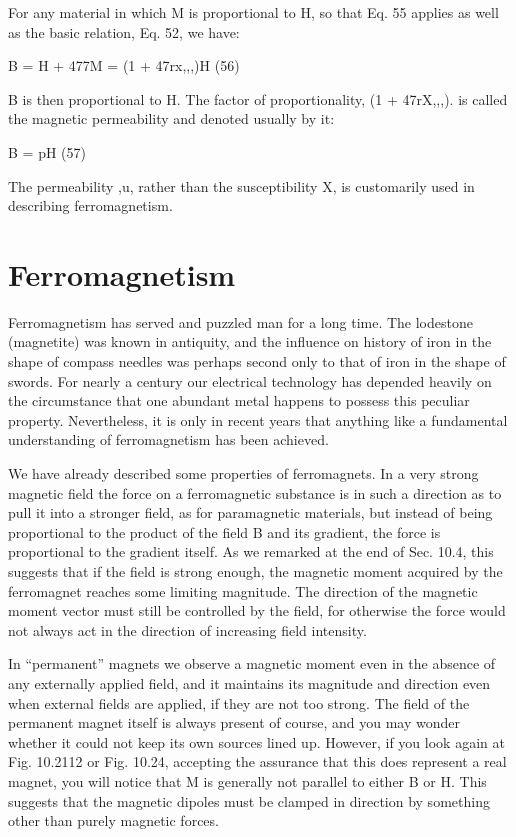 {For any material in which M is proportional to H, so that Eq. 55
applies as well as the basic relation, Eq. 52, we have:
\begin{equation}
\end{equation}

B = H + 477M = (1 + 47rx,,,)H (56)

B is then proportional to H. The factor of proportionality,
(1 + 47rX,,,). is called the magnetic permeability and denoted usually
by it:
\begin{equation}
\end{equation}

B = pH (57)

The permeability ,u, rather than the susceptibility X, is customarily
used in describing ferromagnetism.

\section{Ferromagnetism}

Ferromagnetism has served and puzzled man for a long time.
The lodestone (magnetite) was known in antiquity, and the influence
on history of iron in the shape of compass needles was perhaps second
only to that of iron in the shape of swords. For nearly a century
our electrical technology has depended heavily on the circumstance
that one abundant metal happens to possess this peculiar property.
Nevertheless, it is only in recent years that anything like a fundamental
understanding of ferromagnetism has been achieved.

We have already described some properties of ferromagnets. In
a very strong magnetic field the force on a ferromagnetic substance
is in such a direction as to pull it into a stronger field, as for 
paramagnetic materials, but instead of being proportional to the product
of the field B and its gradient, the force is proportional to the gradient
itself. As we remarked at the end of Sec. 10.4, this suggests
that if the field is strong enough, the magnetic moment acquired by
the ferromagnet reaches some limiting magnitude. The direction
of the magnetic moment vector must still be controlled by the field,
for otherwise the force would not always act in the direction of increasing
field intensity.

In ``permanent'' magnets we observe a magnetic moment even in
the absence of any externally applied field, and it maintains its magnitude
and direction even when external fields are applied, if they
are not too strong. The field of the permanent magnet itself is always
present of course, and you may wonder whether it could not keep
its own sources lined up. However, if you look again at Fig. 10.2112
or Fig. 10.24, accepting the assurance that this does represent a real
magnet, you will notice that M is generally not parallel to either B
or H. This suggests that the magnetic dipoles must be clamped in
direction by something other than purely magnetic forces.

}
